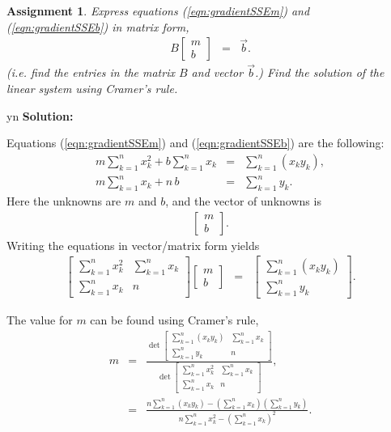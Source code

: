 \documentclass[12pt]{article}
\def\solutions{y}
\def\solutions{n}
\newtheorem{assignment}{Assignment}[section]
\newcommand{\lp}{\left(}
\newcommand{\rp}{\right)}
\begin{document}
\begin{assignment}
  Express equations (\ref{eqn:gradientSSEm}) and
  (\ref{eqn:gradientSSEb}) in matrix form,
  \begin{eqnarray*}
    B 
    \left[
      \begin{array}{rr}
        m \\ b
      \end{array}
      \right] & = & \vec{b}.
  \end{eqnarray*}
  (i.e. find the entries in the matrix $B$ and vector $\vec{b}$.) Find
  the solution of the linear system using Cramer's rule.
\end{assignment}

\if y\solutions
\textbf{Solution:} 

Equations (\ref{eqn:gradientSSEm}) and (\ref{eqn:gradientSSEb}) are
the following:
\begin{eqnarray}
  m \sum_{k=1}^n x_k^2 + b \sum_{k=1}^n x_k & = & 
  \sum_{k=1}^n (x_k y_k), \\
  m \sum_{k=1}^n x_k + n\,b & = & 
  \sum_{k=1}^n y_k.
\end{eqnarray}
Here the unknowns are $m$ and $b$, and the vector of unknowns is
\begin{eqnarray*}
  \left[
    \begin{array}{rr}
      m \\ b
    \end{array}
  \right].
\end{eqnarray*}
Writing the equations in vector/matrix form yields
\begin{eqnarray*}
  \left[
    \begin{array}{rr}
      \sum_{k=1}^n x_k^2  & \sum_{k=1}^n x_k \\
      \sum_{k=1}^n x_k & n
    \end{array}
  \right]
  \left[
    \begin{array}{rr}
      m \\ b
    \end{array}
  \right] & = & 
  \left[
    \begin{array}{rr}
      \sum_{k=1}^n (x_k y_k) \\ \sum_{k=1}^n y_k
    \end{array}
  \right].
\end{eqnarray*}

The value for $m$ can be found using Cramer's rule,
\begin{eqnarray*}
  m & = & \frac{
    \det \left[
    \begin{array}{rr}
      \sum_{k=1}^n (x_k y_k) & \sum_{k=1}^n x_k \\
      \sum_{k=1}^n y_k & n
    \end{array}
  \right]
  }{
    \det \left[
    \begin{array}{rr}
      \sum_{k=1}^n x_k^2  & \sum_{k=1}^n x_k \\
      \sum_{k=1}^n x_k & n
    \end{array}
  \right]
}, \\
& = & \frac{
  n \sum_{k=1}^n (x_k y_k) - \lp \sum_{k=1}^n x_k \rp \lp \sum_{k=1}^n y_k \rp}{
  n \sum_{k=1}^n x_k^2 - \lp \sum_{k=1}^n x_k \rp^2}.
\end{eqnarray*}
\end{document}
